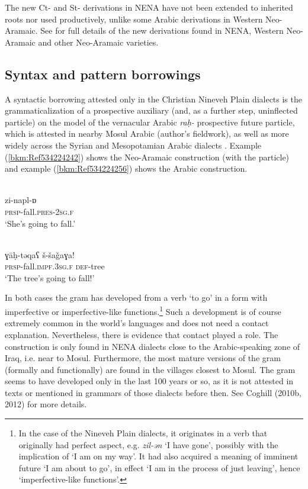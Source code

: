 \documentclass[output=paper]{langsci/langscibook}
\begin{document}
The new Ct- and St- derivations in NENA have not been extended to inherited roots nor used productively, unlike some Arabic derivations in Western Neo-Aramaic. See \citet{Coghill2015} for full details of the new derivations found in NENA, Western Neo-Aramaic and other Neo-Aramaic varieties.

\subsection{\label{bkm:Ref534214095}Syntax and pattern borrowings}

A syntactic borrowing attested only in the Christian Nineveh Plain dialects is the grammaticalization of a prospective auxiliary (and, as a further step, uninflected particle) on the model of the vernacular Arabic \textit{raḥ-} prospective future particle, which is attested in nearby Mosul Arabic (author’s fieldwork), as well as more widely across the Syrian and Mesopotamian Arabic dialects \citep[304]{Jastrow1978}. Example (\ref{bkm:Ref534224242}) shows the Neo-Aramaic construction (with the particle) and example (\ref{bkm:Ref534224256}) shows the Arabic construction.

\ea\label{ex:coghill:}
\\
\gll zi-napl-ɒ\\
     \textsc{prsp-}fall.\textsc{pres}{}-\textsc{2sg.f}\\
\glt ‘She’s going to fall.’\z

\ea\label{ex:coghill:}
\\
\gll ɣāḥ-təqaʕ š-šaǧaɣa!\\
     \textsc{prsp-}fall.\textsc{impf.3sg.f} \textsc{def}{}-tree\\
\glt ‘The tree’s going to fall!’\z

In both cases the gram has developed from a verb ‘to go’ in a form with imperfective or imperfective-like functions.\footnote{In the case of the Nineveh Plain dialects, it originates in a verb that originally had perfect aspect, e.g. \textit{zil-ən} ‘I have gone’, possibly with the implication of ‘I am on my way’. It had also acquired a meaning of imminent future ‘I am about to go’, in effect ‘I am in the process of just leaving’, hence ‘imperfective-like functions’.} Such a development is of course extremely common in the world’s languages and does not need a contact explanation. Nevertheless, there is evidence that contact played a role. The construction is only found in NENA dialects close to the Arabic-speaking zone of Iraq, i.e. near to Mosul. Furthermore, the most mature versions of the gram (formally and functionally) are found in the villages closest to Mosul. The gram seems to have developed only in the last 100 years or so, as it is not attested in texts or mentioned in grammars of those dialects before then. See Coghill (2010b, 2012) for more details.
\end{document}
